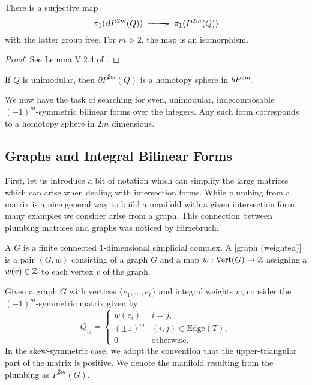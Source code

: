 \begin{proposition}
	There is a surjective map
	\[\pi_1(\partial P^{2m}(Q))\lkxsurj \pi_1(P^{2m}(Q))\]
	with the latter group free. For $m>2$, the map is an isomorphism.
\end{proposition}
\begin{proof}
	See Lemma V.2.4 of \cite{browder1972surgery}.
\end{proof}

\begin{theorem}
	If $Q$ is unimodular, then $\partial P^{2m}(Q)$ is a homotopy sphere in $bP^{2m}$.
\end{theorem}

We now have the task of searching for even, unimodular, indecomposable $(-1)^m$-symmetric bilinear forms over the integers. Any such form corresponds to a homotopy sphere in $2m$ dimensions.

\subsection{Graphs and Integral Bilinear Forms}
First, let us introduce a bit of notation which can simplify the large matrices which can arise when dealing with intersection forms. While plumbing from a matrix is a nice general way to build a manifold with a given intersection form, many examples we consider arise from a graph. This connection between plumbing matrices and graphs was noticed by Hirzebruch.

\begin{definition}
	A  $G$ is a finite connected $1$-dimensional simplicial complex.
	A [graph (weighted)] is a pair $(G,w)$ consisting of a graph $G$ and a map $w : \operatorname{Vert}(G) \to \mathbb{Z}$ assigning a  $w(v)\in \mathbb{Z}$ to each vertex $v$ of the graph.
\end{definition}

Given a graph $G$ with vertices $\{e_1,\ldots, e_\ell\}$ and integral weights $w$, consider the $(-1)^m$-symmetric matrix given by
\[
	Q_{ij} = \begin{cases}
		w(e_i)    & i=j,                       \\
		(\pm 1)^m & (i,j)\in \textrm{Edge}(T), \\
		0         & \textrm{otherwise}.
	\end{cases}
\]
In the skew-symmetric case, we adopt the convention that the upper-triangular part of the matrix is positive. We denote the manifold resulting from the plumbing as $P^{2m}(G)$.

